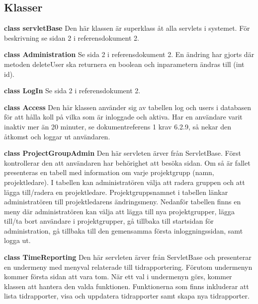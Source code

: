 \documentclass[a4paper]{article}
\begin{document}
\subsection{Klasser}
\begin{hangparas}{1.5em}{1}
\textbf{class servletBase} Den här klassen är superklass åt alla servlets i systemet. För beskrivning se sidan 2 i referensdokument 2.\end{hangparas} 

\vspace{5mm}
\begin{hangparas}{1.5em}{1}
\textbf{class Administration} Se sida 2 i referensdokument 2. En ändring har gjorts där metoden deleteUser ska returnera en boolean och inparametern ändras till (int id).\end{hangparas}

\vspace{5mm}
\begin{hangparas}{1.5em}{1}
\textbf{class LogIn} Se sida 2 i referensdokument 2.\end{hangparas}

\vspace{5mm}
\begin{hangparas}{1.5em}{1}
\textbf{class Access} Den här klassen använder sig av tabellen log och users i databasen för att hålla koll på vilka som är inloggade och aktiva. Har en användare varit inaktiv mer än 20 minuter, se dokumentreferens 1 krav 6.2.9, så nekar den åtkomst och loggar ut användaren. \end{hangparas}

\vspace{5mm}
\begin{hangparas}{1.5em}{1}
\textbf{class ProjectGroupAdmin} Den här servleten ärver från ServletBase. Först kontrollerar den att användaren har behörighet att besöka sidan. Om så är fallet presenteras en tabell med information om varje projektgrupp (namn, projektledare). I tabellen kan administratören välja att radera gruppen och att lägga till/radera en projektledare. Projektgruppsnamnet i tabellen länkar administratören till projektledarens ändringsmeny. Nedanför tabellen finns en meny där administratören kan välja att lägga till nya projektgrupper, lägga till/ta bort användare i projektgrupper, gå tillbaka till startsidan för administration, gå tillbaka till den gemensamma första inloggningssidan, samt logga ut.\end{hangparas}

\vspace{5mm}
\begin{hangparas}{1.5em}{1}
\textbf{class TimeReporting} Den här servleten ärver från ServletBase och presenterar en undermeny med menyval relaterade till tidrapportering. Förutom undermenyn kommer första sidan att vara tom. När ett val i undermenyn görs, kommer klassen att hantera den valda funktionen. Funktionerna som finns inkluderar att lista tidrapporter, visa och uppdatera tidrapporter samt skapa nya tidrapporter.\end{hangparas}
\end{document}
